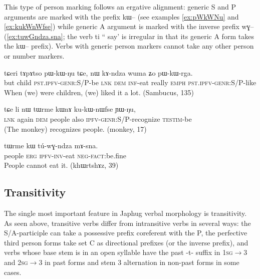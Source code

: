 \documentclass[oldfontcommands,oneside,a4paper,11pt]{article}
\newcommand{\ipa}[1]{{\phon #1}} %
\begin{document}
This type of person marking follows an ergative alignment: generic S and P arguments are marked with the prefix \ipa{kɯ--} (see examples \ref{ex:pWkWNu} and \ref{ex:kukWnWfse}) while generic A argument is marked with the inverse prefix \ipa{wɣ--} (\ref{ex:tuwGndza.sna}; the verb \ipa{ti} `` say' is irregular in that its generic A form takes the \ipa{kɯ--} prefix).  Verbs with generic person markers cannot take any other person or number markers.


\begin{exe}
\ex \label{ex:pWkWNu}
\gll
\ipa{tɕeri} 	\ipa{tɤpɤtso} 	\ipa{pɯ-kɯ-ŋu} 	\ipa{tɕe,} 	\ipa{nɯ} 	\ipa{kɤ-ndza} 	\ipa{wuma} 	\ipa{ʑo} 	\ipa{pɯ-kɯ-rga.} \\
but child \textsc{pst.ipfv-genr}:S/P-be \textsc{lnk} \textsc{dem} \textsc{inf}-eat really \textsc{emph} \textsc{pst.ipfv-genr}:S/P-like \\
\glt When (we) were children, (we) liked it a lot. (Sambucus, 135)
\end{exe}


\begin{exe}
\ex \label{ex:kukWnWfse}
\gll
\ipa{tɕe}  	\ipa{li}  	\ipa{nɯ}  	\ipa{tɯrme}  	\ipa{kɯnɤ}  	\ipa{ku-kɯ-nɯfse}  	\ipa{ɲɯ-ŋu,}\\
\textsc{lnk} again \textsc{dem} people also \textsc{ipfv-genr:S/P}-recognize \textsc{testim}-be\\
\glt  (The monkey) recognizes people. (monkey, 17)
\end{exe}

\begin{exe}
\ex \label{ex:tuwGndza.sna}
\gll
\ipa{tɯrme}  	\ipa{kɯ}  	\ipa{tú-wɣ-ndza}  	\ipa{mɤ-sna.}   \\
people \textsc{erg} \textsc{ipfv-inv}-eat \textsc{neg-fact}:be.fine \\
\glt People cannot eat it. (\ipa{khɯrtshɤz}, 39)
\end{exe}

\subsection{Transitivity}
The single most important feature in Japhug verbal morphology is transitivity. As seen above, transitive verbs differ from intransitive verbs in several ways: the S/A-participle can take a possessive prefix coreferent with the P, the perfective third person forms take set C as directional prefixes (or the inverse prefix), and verbs whose base stem is in an open syllable have the past \ipa{-t-} suffix in \textsc{1sg$\rightarrow$3} and \textsc{2sg$\rightarrow$3} in past forms and stem 3 alternation in non-past forms in some cases.
\end{document}
